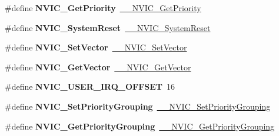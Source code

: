 \begin{DoxyCompactItemize}
\#define {\bfseries N\+V\+I\+C\+\_\+\+Get\+Priority}~\mbox{\hyperlink{group___c_m_s_i_s___core___n_v_i_c_functions_gaeb9dc99c8e7700668813144261b0bc73}{\+\_\+\+\_\+\+N\+V\+I\+C\+\_\+\+Get\+Priority}}
\item 
\mbox{\label{group___c_m_s_i_s___core___n_v_i_c_functions_ga6aa0367d3642575610476bf0366f0c48}} 
\#define {\bfseries N\+V\+I\+C\+\_\+\+System\+Reset}~\mbox{\hyperlink{group___c_m_s_i_s___core___n_v_i_c_functions_ga0d9aa2d30fa54b41eb780c16e35b676c}{\+\_\+\+\_\+\+N\+V\+I\+C\+\_\+\+System\+Reset}}
\item 
\mbox{\label{group___c_m_s_i_s___core___n_v_i_c_functions_ga804af63bb4c4c317387897431814775d}} 
\#define {\bfseries N\+V\+I\+C\+\_\+\+Set\+Vector}~\mbox{\hyperlink{group___c_m_s_i_s___core___n_v_i_c_functions_ga0df355460bc1783d58f9d72ee4884208}{\+\_\+\+\_\+\+N\+V\+I\+C\+\_\+\+Set\+Vector}}
\item 
\mbox{\label{group___c_m_s_i_s___core___n_v_i_c_functions_ga955eb1c33a3dcc62af11a8385e8c0fc8}} 
\#define {\bfseries N\+V\+I\+C\+\_\+\+Get\+Vector}~\mbox{\hyperlink{group___c_m_s_i_s___core___n_v_i_c_functions_ga44b665d2afb708121d9b10c76ff00ee5}{\+\_\+\+\_\+\+N\+V\+I\+C\+\_\+\+Get\+Vector}}
\item 
\mbox{\label{group___c_m_s_i_s___core___n_v_i_c_functions_ga8045d905a5ca57437d8e6f71ffcb6df5}} 
\#define {\bfseries N\+V\+I\+C\+\_\+\+U\+S\+E\+R\+\_\+\+I\+R\+Q\+\_\+\+O\+F\+F\+S\+ET}~16
\item 
\mbox{\label{group___c_m_s_i_s___core___n_v_i_c_functions_ga0e798d5aec68cdd8263db86a76df788f}} 
\#define {\bfseries N\+V\+I\+C\+\_\+\+Set\+Priority\+Grouping}~\mbox{\hyperlink{group___c_m_s_i_s___core___n_v_i_c_functions_gafc94dcbaee03e4746ade1f5bb9aaa56d}{\+\_\+\+\_\+\+N\+V\+I\+C\+\_\+\+Set\+Priority\+Grouping}}
\item 
\mbox{\label{group___c_m_s_i_s___core___n_v_i_c_functions_ga4eeb9214f2264fc23c34ad5de2d3fa11}} 
\#define {\bfseries N\+V\+I\+C\+\_\+\+Get\+Priority\+Grouping}~\mbox{\hyperlink{group___c_m_s_i_s___core___n_v_i_c_functions_ga9b894af672df4373eb637f8288845c05}{\+\_\+\+\_\+\+N\+V\+I\+C\+\_\+\+Get\+Priority\+Grouping}}

\end{DoxyCompactItemize}
